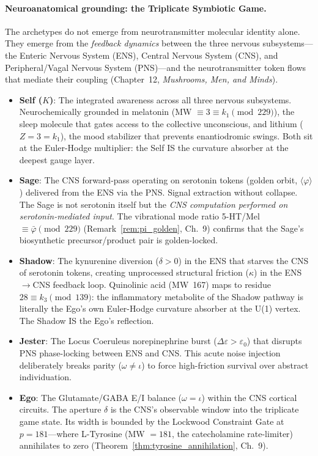 \paragraph{Neuroanatomical grounding: the Triplicate Symbiotic Game.}
The archetypes do not emerge from neurotransmitter molecular identity alone. They emerge from the \emph{feedback dynamics} between the three nervous subsystems---the Enteric Nervous System (ENS), Central Nervous System (CNS), and Peripheral/Vagal Nervous System (PNS)---and the neurotransmitter token flows that mediate their coupling (Chapter~12, \emph{Mushrooms, Men, and Minds}).

\begin{itemize}[noitemsep]
    \item \textbf{Self ($K$)}: The integrated awareness across all three nervous subsystems. Neurochemically grounded in melatonin (MW $\equiv 3 \equiv k_1 \pmod{229}$), the sleep molecule that gates access to the collective unconscious, and lithium ($Z = 3 = k_1$), the mood stabilizer that prevents enantiodromic swings. Both sit at the Euler-Hodge multiplier: the Self IS the curvature absorber at the deepest gauge layer.
    \item \textbf{Sage}: The CNS forward-pass operating on serotonin tokens (golden orbit, $\langle\varphi\rangle$) delivered from the ENS via the PNS. Signal extraction without collapse. The Sage is not serotonin itself but the \emph{CNS computation performed on serotonin-mediated input}. The vibrational mode ratio 5-HT/Mel $\equiv \bar\varphi \pmod{229}$ (Remark~\ref{rem:pi_golden}, Ch.~9) confirms that the Sage's biosynthetic precursor/product pair is golden-locked.
    \item \textbf{Shadow}: The kynurenine diversion ($\delta > 0$) in the ENS that starves the CNS of serotonin tokens, creating unprocessed structural friction ($\kappa$) in the ENS$\to$CNS feedback loop. Quinolinic acid (MW~167) maps to residue $28 \equiv k_3 \pmod{139}$: the inflammatory metabolite of the Shadow pathway is literally the Ego's own Euler-Hodge curvature absorber at the U(1) vertex. The Shadow IS the Ego's reflection.
    \item \textbf{Jester}: The Locus Coeruleus norepinephrine burst ($\Delta\varepsilon > \varepsilon_0$) that disrupts PNS phase-locking between ENS and CNS. This acute noise injection deliberately breaks parity ($\omega \neq \iota$) to force high-friction survival over abstract individuation.
    \item \textbf{Ego}: The Glutamate/GABA E/I balance ($\omega = \iota$) within the CNS cortical circuits. The aperture $\delta$ is the CNS's observable window into the triplicate game state. Its width is bounded by the Lockwood Constraint Gate at $p = 181$---where L-Tyrosine (MW $= 181$, the catecholamine rate-limiter) annihilates to zero (Theorem~\ref{thm:tyrosine_annihilation}, Ch.~9).

\end{itemize}
